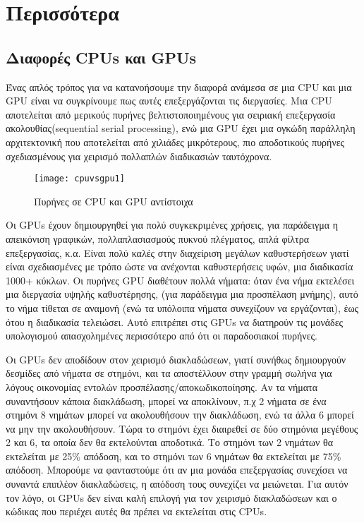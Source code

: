 \chapter{Περισσότερα}

\section{Διαφορές CPUs και GPUs}

Ένας απλός τρόπος για να κατανοήσουμε την διαφορά ανάμεσα σε μια CPU και μια GPU είναι να συγκρίνουμε πως αυτές επεξεργάζονται τις διεργασίες. Μια CPU αποτελείται από μερικούς πυρήνες βελτιστοποιημένους για σειριακή επεξεργασία ακολουθίας(sequential serial processing), ενώ μια GPU έχει μια ογκώδη παράλληλη αρχιτεκτονική που αποτελείται από χιλιάδες μικρότερους, πιο αποδοτικούς πυρήνες σχεδιασμένους για χειρισμό πολλαπλών διαδικασιών ταυτόχρονα.

\begin{figure}[h]
\centering
\texttt{[image: cpuvsgpu1]}
\caption{Πυρήνες σε CPU και GPU αντίστοιχα}
\end{figure}

Οι GPUs έχουν δημιουργηθεί για πολύ συγκεκριμένες χρήσεις, για παράδειγμα η απεικόνιση γραφικών, πολλαπλασιασμούς πυκνού πλέγματος, απλά φίλτρα επεξεργασίας, κ.α. Είναι πολύ καλές στην διαχείριση μεγάλων καθυστερήσεων γιατί είναι σχεδιασμένες με τρόπο ώστε να ανέχονται καθυστερήσεις υφών, μια διαδικασία 1000+ κύκλων. Οι πυρήνες GPU διαθέτουν πολλά νήματα: όταν ένα νήμα εκτελέσει μια διεργασία υψηλής καθυστέρησης, (για παράδειγμα μια προσπέλαση μνήμης), αυτό το νήμα τίθεται σε αναμονή (ενώ τα υπόλοιπα νήματα συνεχίζουν να εργάζονται), έως ότου η διαδικασία τελειώσει. Αυτό επιτρέπει στις GPUs να διατηρούν τις μονάδες υπολογισμού απασχολημένες περισσότερο από ότι οι παραδοσιακοί πυρήνες.

Οι GPUs δεν αποδίδουν στον χειρισμό διακλαδώσεων, γιατί συνήθως δημιουργούν δεσμίδες από νήματα σε στημόνι, και τα αποστέλλουν στην γραμμή σωλήνα για λόγους οικονομίας εντολών προσπέλασης/αποκωδικοποίησης. Αν τα νήματα συναντήσουν κάποια διακλάδωση, μπορεί να αποκλίνουν, π.χ 2 νήματα σε ένα στημόνι 8 νημάτων μπορεί να ακολουθήσουν την διακλάδωση, ενώ τα άλλα 6 μπορεί να μην την ακολουθήσουν. Τώρα το στημόνι έχει διαιρεθεί σε δύο στημόνια μεγέθους 2 και 6, τα οποία δεν θα εκτελούνται αποδοτικά. Το στημόνι των 2 νημάτων θα εκτελείται με 25\% απόδοση, και το στημόνι των 6 νημάτων θα εκτελείται με 75\% απόδοση. Μπορούμε να φανταστούμε ότι αν μια μονάδα επεξεργασίας συνεχίσει να συναντά επιπλέον διακλαδώσεις, η απόδοση τους συνεχίζει να μειώνεται. Για αυτόν τον λόγο, οι GPUs δεν είναι καλή επιλογή για τον χειρισμό διακλαδώσεων και ο κώδικας που περιέχει αυτές θα πρέπει να εκτελείται στις CPUs.

